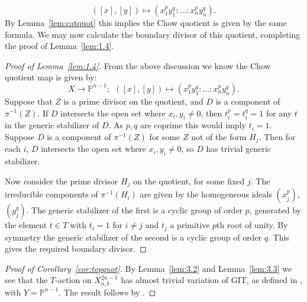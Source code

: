 \documentclass{amsart}
\theoremstyle{definition}
\newcommand{\PP}{\mathbb{P}}
\begin{document}
\[
([x],[y]) \mapsto (x_1^p y_1^q: \dots : x_n^p y_n^q).
\]
By Lemma~\ref{lem:catquot} this implies the Chow quotient is given by the same formula. We may now calculate the boundary divisor of this quotient, completing the proof of Lemma~\ref{lem:1.4}.
\begin{proof}[Proof of Lemma~\ref{lem:1.4}]
From the above discussion we know the Chow quotient map is given by:
\[
X \to \PP^{n-1}; \ \ ([x],[y]) \mapsto (x_1^p y_1^q: \dots : x_n^p y_n^q ).
\]
Suppose that \(Z\) is a prime divisor on the quotient, and \(D\) is a component of \(\pi^{-1}(Z)\). If \(D\) intersects the open set where \(x_i,y_i \neq 0\), then \(t_i^p = t_i^q = 1\) for any \(t\) in the generic stabilizer of \(D\). As \(p,q\) are coprime this would imply \(t_i = 1\). Suppose \(D\) is a component of \(\pi^{-1}(Z)\) for some \(Z\) not of the form \(H_j\). Then for each \(i\), \(D\) intersects the open set where \(x_i,y_i \neq 0\), so \(D\) has trivial generic stabilizer.

Now consider the prime divisor \(H_j\) on the quotient, for some fixed \(j\). The irreducible components of \(\pi^{-1}(H_i)\) are given by the homogeneous ideals \((x_j^p)\), \((y_j^q)\). The generic stabilizer of the first is a cyclic group of order \(p\), generated by the element \(t \in T\) with \(t_i = 1\) for \(i \neq j\) and \(t_j\) a primitive \(p\)th root of unity. By symmetry the generic stabilizer of the second is a cyclic group of order \(q\). This gives the required boundary divisor.
\end{proof}
\begin{proof}[Proof of Corollary~\ref{cor:topquot}]
By Lemma~\ref{lem:3.2} and Lemma~\ref{lem:3.3} we see that the \(T\)-action on \(X^{2n-1}_{a,b}\) has almost trivial variation of GIT, as defined in \cite[Definition 2.7]{suess18-2}, with \(Y = \PP^{n-1}\). The result follows by \cite[Proposition 2.9]{suess18-2}.
\end{proof}
\end{document}

